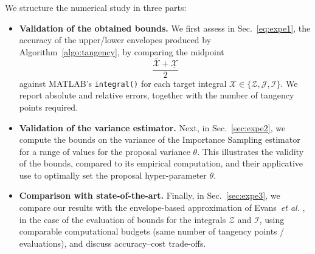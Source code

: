 \documentclass[review]{elsarticle}
\begin{document}







We structure the numerical study in three parts:

\begin{itemize}
  \item \textbf{Validation of the obtained bounds.}
  We first assess in Sec.~\ref{eq:expe1}, the accuracy of the upper/lower envelopes produced by Algorithm~\ref{algo:tangency}, by comparing the midpoint
  $$
    \frac{\overline{\mathcal{X}}+\underline{\mathcal{X}}}{2}
  $$
  against MATLAB's \texttt{integral()} for each target integral $\mathcal{X}\in\{\mathcal{Z},\mathcal{J},\mathcal{I}\}$. We report absolute and relative errors, together with the number of tangency points required.

  \item \textbf{Validation of the variance estimator.}
  Next, in Sec.~\ref{sec:expe2}, we compute the bounds on the variance of the Importance Sampling estimator for a range of values for the proposal variance $\theta$. This illustrates the validity of the bounds, compared to its empirical computation, and their applicative use to optimally set the proposal hyper-parameter $\theta$. 

  \item \textbf{Comparison with state-of-the-art.}  Finally, in Sec.~\ref{sec:expe3}, we compare our results with the envelope-based approximation of Evans~\emph{et al.} \cite{evans1997approximation}, in the case of the evaluation of bounds for the integrals $\mathcal{Z}$ and $\mathcal{I}$, using comparable computational budgets (same number of tangency points / evaluations), and discuss accuracy–cost trade-offs.
\end{itemize}
\end{document}
